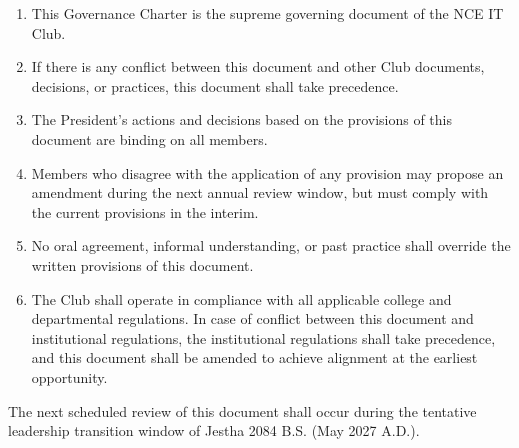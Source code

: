 
\begin{enumerate}[label=\alph*), leftmargin=2em, itemsep=0.3em]
    \item This Governance Charter is the supreme governing document of the NCE IT Club.
    
    \item If there is any conflict between this document and other Club documents, decisions, or practices, this document shall take precedence.
    
    \item The President's actions and decisions based on the provisions of this document are binding on all members.
    
    \item Members who disagree with the application of any provision may propose an amendment during the next annual review window, but must comply with the current provisions in the interim.
    
    \item No oral agreement, informal understanding, or past practice shall override the written provisions of this document.
    
    \item The Club shall operate in compliance with all applicable college and departmental regulations. In case of conflict between this document and institutional regulations, the institutional regulations shall take precedence, and this document shall be amended to achieve alignment at the earliest opportunity.
\end{enumerate}


The next scheduled review of this document shall occur during the tentative leadership transition window of Jestha 2084 B.S. (May 2027 A.D.).
